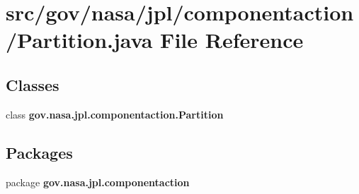 \section{src/gov/nasa/jpl/componentaction/\+Partition.java File Reference}
\label{_partition_8java}
\subsection*{Classes}
\begin{DoxyCompactItemize}
\item 
class {\bf gov.\+nasa.\+jpl.\+componentaction.\+Partition}
\end{DoxyCompactItemize}
\subsection*{Packages}
\begin{DoxyCompactItemize}
\item 
package {\bf gov.\+nasa.\+jpl.\+componentaction}
\end{DoxyCompactItemize}
